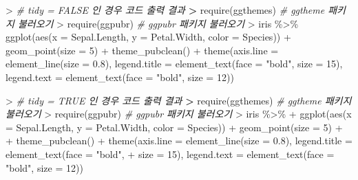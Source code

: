 \documentclass[
  11pt,
]{krantz}
\newenvironment{Shaded}{\begin{snugshade}}{\end{snugshade}}
\newcommand{\AttributeTok}[1]{\textcolor[rgb]{0.61,0.61,0.61}{#1}}
\newcommand{\CommentTok}[1]{\textcolor[rgb]{0.37,0.37,0.37}{\textit{#1}}}
\newcommand{\DecValTok}[1]{\textcolor[rgb]{0.06,0.06,0.06}{#1}}
\newcommand{\ErrorTok}[1]{\textcolor[rgb]{0.14,0.14,0.14}{\textbf{#1}}}
\newcommand{\FloatTok}[1]{\textcolor[rgb]{0.06,0.06,0.06}{#1}}
\newcommand{\FunctionTok}[1]{\textcolor[rgb]{0,0,0}{#1}}
\newcommand{\NormalTok}[1]{#1}
\newcommand{\SpecialCharTok}[1]{\textcolor[rgb]{0,0,0}{#1}}
\newcommand{\StringTok}[1]{\textcolor[rgb]{0.5,0.5,0.5}{#1}}
\begin{document}
\footnotesize

\begin{Shaded}
\begin{Highlighting}[]
\SpecialCharTok{\textgreater{}} \CommentTok{\# tidy = FALSE 인 경우 코드 출력 결과}
\ErrorTok{\textgreater{}} \FunctionTok{require}\NormalTok{(ggthemes) }\CommentTok{\# ggtheme 패키지 불러오기}
\SpecialCharTok{\textgreater{}} \FunctionTok{require}\NormalTok{(ggpubr) }\CommentTok{\# ggpubr 패키지 불러오기}
\SpecialCharTok{\textgreater{}}\NormalTok{ iris }\SpecialCharTok{\%\textgreater{}\%} \FunctionTok{ggplot}\NormalTok{(}\FunctionTok{aes}\NormalTok{(}\AttributeTok{x =}\NormalTok{ Sepal.Length, }\AttributeTok{y =}\NormalTok{ Petal.Width, }\AttributeTok{color =}\NormalTok{ Species)) }\SpecialCharTok{+} \FunctionTok{geom\_point}\NormalTok{(}\AttributeTok{size =} \DecValTok{5}\NormalTok{) }\SpecialCharTok{+} \FunctionTok{theme\_pubclean}\NormalTok{() }\SpecialCharTok{+} \FunctionTok{theme}\NormalTok{(}\AttributeTok{axis.line =} \FunctionTok{element\_line}\NormalTok{(}\AttributeTok{size =} \FloatTok{0.8}\NormalTok{), }\AttributeTok{legend.title =} \FunctionTok{element\_text}\NormalTok{(}\AttributeTok{face =} \StringTok{"bold"}\NormalTok{, }\AttributeTok{size =} \DecValTok{15}\NormalTok{), }\AttributeTok{legend.text =} \FunctionTok{element\_text}\NormalTok{(}\AttributeTok{face =} \StringTok{"bold"}\NormalTok{, }\AttributeTok{size =} \DecValTok{12}\NormalTok{))}
\end{Highlighting}
\end{Shaded}

\normalsize

\footnotesize

\begin{Shaded}
\begin{Highlighting}[]
\SpecialCharTok{\textgreater{}} \CommentTok{\# tidy = TRUE 인 경우 코드 출력 결과}
\ErrorTok{\textgreater{}} \FunctionTok{require}\NormalTok{(ggthemes)  }\CommentTok{\# ggtheme 패키지 불러오기}
\SpecialCharTok{\textgreater{}} \FunctionTok{require}\NormalTok{(ggpubr)  }\CommentTok{\# ggpubr 패키지 불러오기}
\SpecialCharTok{\textgreater{}}\NormalTok{ iris }\SpecialCharTok{\%\textgreater{}\%}
\SpecialCharTok{+}     \FunctionTok{ggplot}\NormalTok{(}\FunctionTok{aes}\NormalTok{(}\AttributeTok{x =}\NormalTok{ Sepal.Length, }\AttributeTok{y =}\NormalTok{ Petal.Width, }\AttributeTok{color =}\NormalTok{ Species)) }\SpecialCharTok{+} \FunctionTok{geom\_point}\NormalTok{(}\AttributeTok{size =} \DecValTok{5}\NormalTok{) }\SpecialCharTok{+} 
\SpecialCharTok{+}     \FunctionTok{theme\_pubclean}\NormalTok{() }\SpecialCharTok{+} \FunctionTok{theme}\NormalTok{(}\AttributeTok{axis.line =} \FunctionTok{element\_line}\NormalTok{(}\AttributeTok{size =} \FloatTok{0.8}\NormalTok{), }\AttributeTok{legend.title =} \FunctionTok{element\_text}\NormalTok{(}\AttributeTok{face =} \StringTok{"bold"}\NormalTok{, }
\SpecialCharTok{+}     \AttributeTok{size =} \DecValTok{15}\NormalTok{), }\AttributeTok{legend.text =} \FunctionTok{element\_text}\NormalTok{(}\AttributeTok{face =} \StringTok{"bold"}\NormalTok{, }\AttributeTok{size =} \DecValTok{12}\NormalTok{))}
\end{Highlighting}
\end{Shaded}
\end{document}
